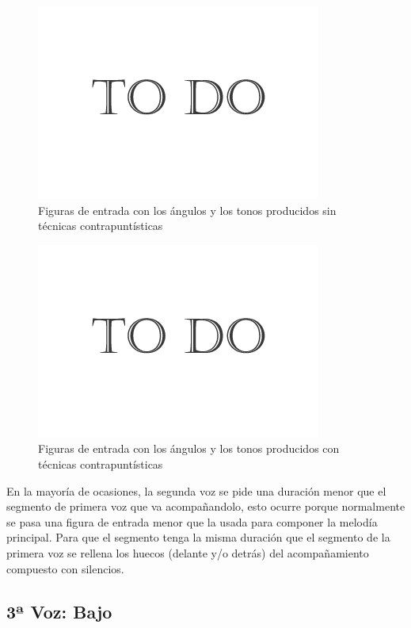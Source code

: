 		\begin{figure}[htbp]
		\centering
		\hspace*{0.0in}
		\includegraphics[scale=0.57]{graphics/todo.png}
		\caption{Figuras de entrada con los ángulos y los tonos producidos sin técnicas contrapuntísticas}
		\label{fig:Figura2Voz2}
		\end{figure}

		\begin{figure}[htbp]
		\centering
		\hspace*{0.0in}
		\includegraphics[scale=0.57]{graphics/todo.png}
		\caption{Figuras de entrada con los ángulos y los tonos producidos con técnicas contrapuntísticas}
		\label{fig:Figura3Voz2}
		\end{figure}

En la mayoría de ocasiones, la segunda voz se pide una duración menor que el segmento de primera voz que va acompañandolo, esto ocurre porque normalmente se pasa una figura de entrada menor que la usada para componer la melodía principal. Para que el segmento tenga la misma duración que el segmento de la primera voz se rellena los huecos (delante y/o detrás) del acompañamiento compuesto con silencios.

\subsection{3ª Voz: Bajo}

